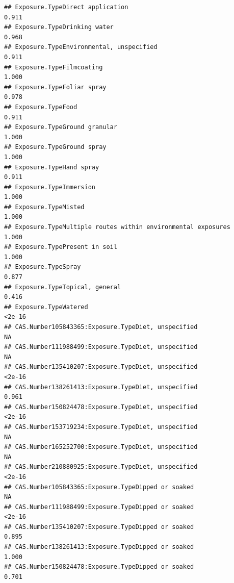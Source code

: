 \documentclass[
  12pt,
]{article}
\begin{document}
\begin{verbatim}
## Exposure.TypeDirect application                                                    0.911
## Exposure.TypeDrinking water                                                        0.968
## Exposure.TypeEnvironmental, unspecified                                            0.911
## Exposure.TypeFilmcoating                                                           1.000
## Exposure.TypeFoliar spray                                                          0.978
## Exposure.TypeFood                                                                  0.911
## Exposure.TypeGround granular                                                       1.000
## Exposure.TypeGround spray                                                          1.000
## Exposure.TypeHand spray                                                            0.911
## Exposure.TypeImmersion                                                             1.000
## Exposure.TypeMisted                                                                1.000
## Exposure.TypeMultiple routes within environmental exposures                        1.000
## Exposure.TypePresent in soil                                                       1.000
## Exposure.TypeSpray                                                                 0.877
## Exposure.TypeTopical, general                                                      0.416
## Exposure.TypeWatered                                                              <2e-16
## CAS.Number105843365:Exposure.TypeDiet, unspecified                                    NA
## CAS.Number111988499:Exposure.TypeDiet, unspecified                                    NA
## CAS.Number135410207:Exposure.TypeDiet, unspecified                                <2e-16
## CAS.Number138261413:Exposure.TypeDiet, unspecified                                 0.961
## CAS.Number150824478:Exposure.TypeDiet, unspecified                                <2e-16
## CAS.Number153719234:Exposure.TypeDiet, unspecified                                    NA
## CAS.Number165252700:Exposure.TypeDiet, unspecified                                    NA
## CAS.Number210880925:Exposure.TypeDiet, unspecified                                <2e-16
## CAS.Number105843365:Exposure.TypeDipped or soaked                                     NA
## CAS.Number111988499:Exposure.TypeDipped or soaked                                 <2e-16
## CAS.Number135410207:Exposure.TypeDipped or soaked                                  0.895
## CAS.Number138261413:Exposure.TypeDipped or soaked                                  1.000
## CAS.Number150824478:Exposure.TypeDipped or soaked                                  0.701

\end{verbatim}
\end{document}
